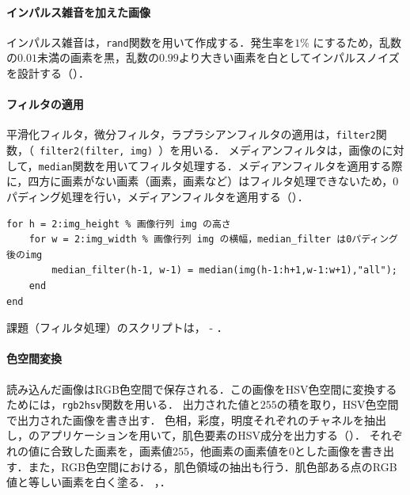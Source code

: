\paragraph{インパルス雑音を加えた画像}
インパルス雑音は，\texttt{rand}関数を用いて作成する．発生率を\(1\%\) にするため，乱数の\(0.01\)未満の画素を黒，乱数の\(0.99\)より大きい画素を白としてインパルスノイズを設計する（）．
\paragraph{フィルタの適用}
平滑化フィルタ，微分フィルタ，ラプラシアンフィルタの適用は，\texttt{filter2}関数，（\ \verb|filter2(filter, img)|\ ）を用いる．
メディアンフィルタは，画像のに対して，\texttt{median}関数を用いてフィルタ処理する．メディアンフィルタを適用する際に，四方に画素がない画素（画素，画素など）はフィルタ処理できないため，0パディング処理を行い，メディアンフィルタを適用する（）．
\begin{lstlisting}[caption={メディアンフィルタの適用},label={src:メディアンフィルタの適用},frame={left}]
for h = 2:img_height % 画像行列 img の高さ
    for w = 2:img_width % 画像行列 img の横幅，median_filter は0パディング後のimg
        median_filter(h-1, w-1) = median(img(h-1:h+1,w-1:w+1),"all"); 
    end
end
\end{lstlisting}
課題（フィルタ処理）のスクリプトは， - ．
\paragraph{色空間変換}
読み込んだ画像はRGB色空間で保存される．この画像をHSV色空間に変換するためには，\texttt{rgb2hsv}関数を用いる．
出力された値と\(255\)の積を取り，HSV色空間で出力された画像を書き出す．
色相，彩度，明度それぞれのチャネルを抽出し，\matlab のアプリケーションを用いて，肌色要素のHSV成分を出力する（）．
それぞれの値に合致した画素を，画素値\(255\)，他画素の画素値を\(0\)とした画像を書き出す．また，RGB色空間における，肌色領域の抽出も行う．肌色部ある点のRGB値と等しい画素を白く塗る．
\scall{\kadaibe}，．
